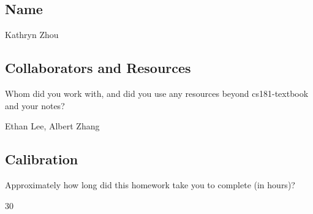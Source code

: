 \documentclass[submit]{harvardml}
\begin{document}
\newpage
\subsection*{Name}
Kathryn Zhou

\subsection*{Collaborators and Resources}
Whom did you work with, and did you use any resources beyond cs181-textbook and your notes?

Ethan Lee, Albert Zhang

\subsection*{Calibration}
Approximately how long did this homework take you to complete (in hours)? 

30
\end{document}
